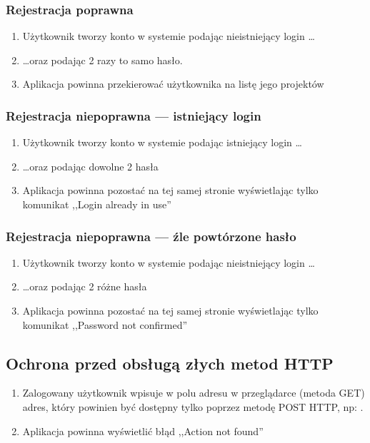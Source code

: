 \documentclass[a4paper,12pt,notitlepage]{mwrep}
\begin{document}
\subsubsection{Rejestracja poprawna}
\begin{enumerate}
	\item	Użytkownik tworzy konto w systemie podając nieistniejący login \ldots
	\item	\ldots oraz podając 2 razy to samo hasło.
	\item	Aplikacja powinna przekierować użytkownika na listę jego projektów
\end{enumerate}

\subsubsection{Rejestracja niepoprawna --- istniejący login}
\begin{enumerate}
	\item	Użytkownik tworzy konto w systemie podając istniejący login \ldots
	\item	\ldots oraz podając dowolne 2 hasła
	\item	Aplikacja powinna pozostać na tej samej stronie wyświetlając tylko komunikat
		,,Login already in use''
\end{enumerate}

\subsubsection{Rejestracja niepoprawna --- źle powtórzone hasło}
\begin{enumerate}
	\item	Użytkownik tworzy konto w systemie podając nieistniejący login \ldots
	\item	\ldots oraz podając 2 różne hasła
	\item	Aplikacja powinna pozostać na tej samej stronie wyświetlając tylko komunikat
		,,Password not confirmed''
\end{enumerate}

\subsection{Ochrona przed obsługą złych metod HTTP}
\begin{enumerate}
	\item	Zalogowany użytkownik wpisuje w polu adresu w przeglądarce (metoda GET)
			adres, który powinien być dostępny tylko poprzez metodę POST HTTP, np:
			.
	\item	Aplikacja powinna wyświetlić błąd ,,Action not found''
\end{enumerate}
\end{document}
